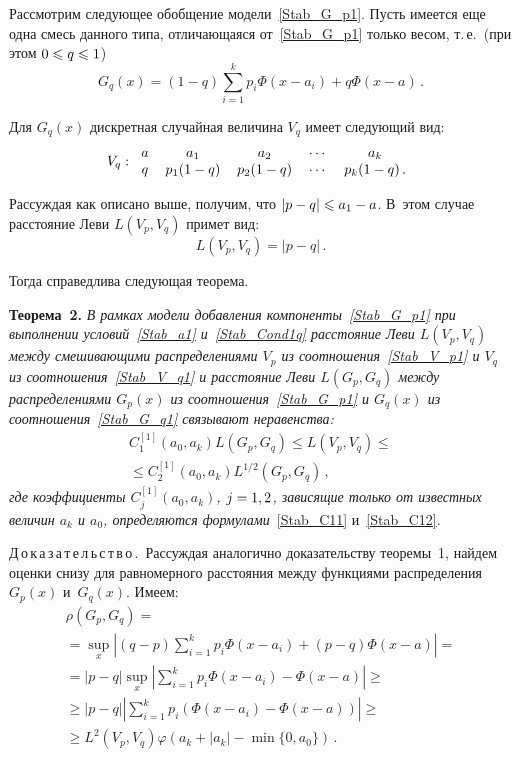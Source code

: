 \begin{multicols}{2}
\medskip

Рассмотрим следующее обобщение модели~\eqref{Stab_G_p1}. Пусть
имеется еще одна смесь данного типа, отличающаяся
от~\eqref{Stab_G_p1} только весом, т.\,е.\ (при этом $0\hm\leqslant q\hm\leqslant 1$)
\begin{equation}
\label{Stab_G_q1}
G_q(x)=(1-q)\sum\limits_{i=1}^k
p_i\Phi(x-a_i)+q\Phi(x-a)\,.
\end{equation}

Для $G_q(x)$ дискретная случайная величина $V_q$ имеет следующий
вид:
\begin{equation}
\label{Stab_V_q1} 
V_q:
\begin{tabular}{ccccc}
$a$&$a_1$&$a_2$&$\cdots$&$a_k$\\
$q$&$p_1(1-q)$&$p_2(1-q)$&$\cdots$&$p_k(1-q)$\,.
\end{tabular}
\end{equation}

Рассуждая как описано выше, получим, что $|p-q|\hm\leqslant a_1-a$. В~этом
случае расстояние Леви $L(V_p,V_q)$ примет вид:
\begin{equation}
\label{Stab_Cond1q}
L(V_p,V_q)=|p-q|\,.
\end{equation}

Тогда справедлива следующая теорема.

\medskip

\noindent
\textbf{Теорема~2.}
\textit{В рамках модели добавления
компоненты~\eqref{Stab_G_p1} при выполнении
условий~\eqref{Stab_a1} и~\eqref{Stab_Cond1q} расстояние
Леви $L(V_p,V_q)$ между смешивающими распределениями $V_p$ из
соотношения~\eqref{Stab_V_p1} и $V_q$ из
соотношения~\eqref{Stab_V_q1} и расстояние Леви $L(G_p,G_q)$
между распределениями $G_p(x)$ из соотношения~\eqref{Stab_G_p1} и
$G_q(x)$ из соотношения~\eqref{Stab_G_q1} связывают неравенства:}
\begin{multline*}
C_1^{[1]}(a_0,a_k)L(G_p,G_q)\leqslant L(V_p,V_q)\leqslant{}\\
{}\leqslant
C_2^{[1]}(a_0,a_k)L^{1/2}(G_p,G_q)\,,
\end{multline*}
\textit{где коэффициенты $C_j^{[1]}(a_0,a_k)$, $j\hm=1,2$, зависящие
только от известных величин $a_k$ и $a_0$, определяются
формулами}~\eqref{Stab_C11} и~\eqref{Stab_C12}.

\medskip


\noindent
Д\,о\,к\,а\,з\,а\,т\,е\,л\,ь\,с\,т\,в\,о\,.\ 
Рассуждая аналогично доказательству теоремы~1,
найдем оценки снизу для равномерного расстояния между функциями
распределения $G_p(x)$ и~$G_q(x)$. Имеем:
\begin{multline*}
\rho(G_p,G_q)={}\\
{}=\sup\limits_x|(q-p)\sum\limits_{i=1}^k
p_i\Phi(x-a_i)+(p-q)\Phi(x-a)|={}\\
{}=|p-q|\sup\limits_x\left|\sum\limits_{i=1}^k
p_i\Phi(x-a_i)-\Phi(x-a)\right|\geqslant{}\\
{}\geqslant |p-q|\left|\sum\limits_{i=1}^k
p_i(\Phi(x-a_i)-\Phi(x-a))\right|\geqslant{}\\
{}\geqslant L^2(V_p,V_q)\varphi\left(a_k+|a_k|-\min\{0,a_0\}\right)\,.
\end{multline*}


\end{multicols}
